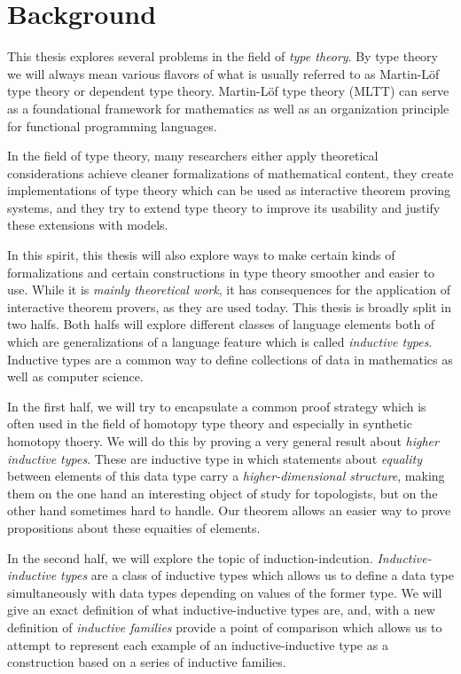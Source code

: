 \section{Background}

This thesis explores several problems in the field of \emph{type theory}.
By type theory we will always mean various flavors of what is usually
referred to as Martin-Löf type theory or dependent type theory.
Martin-Löf type theory (MLTT) can serve as a foundational framework for
mathematics as well as an organization principle for functional programming languages.

In the field of type theory, many researchers either apply theoretical considerations
achieve cleaner formalizations of mathematical content,
they create implementations of type theory which can be used as
interactive theorem proving systems, and they try to extend type
theory to improve its usability and justify these extensions with models.

In this spirit, this thesis will also explore ways to make certain kinds of formalizations
and certain constructions in type theory smoother and easier to use.
While it is \emph{mainly theoretical work}, it has consequences for the application of
interactive theorem provers, as they are used today.
This thesis is broadly split in two halfs.
Both halfs will explore different classes of language elements both of which are generalizations
of a language feature which is
called \emph{inductive types}.
Inductive types are a common way to define collections of data in mathematics
as well as computer science.

In the first half, we will try to encapsulate a common proof strategy which
is often used in the field of homotopy type theory and especially in
synthetic homotopy thoery.
We will do this by
proving a very general result about \emph{higher inductive types}.
These are inductive type in which statements about \emph{equality} between
elements of this data type carry a \emph{higher-dimensional structure},
making them on the one hand an interesting object of study for topologists,
but on the other hand sometimes hard to handle.
Our theorem allows an easier way to prove propositions about these
equaities of elements.

In the second half, we will explore the topic of induction-indcution.
\emph{Inductive-inductive types} are a class of inductive types which
allows us to define a data type simultaneously with data types depending on
values of the former type.
We will give an exact definition of what inductive-inductive types are,
and, with a new definition of \emph{inductive families} provide a point of
comparison which allows us to attempt to represent each example of
an inductive-inductive type as a construction based on a series of
inductive families.

